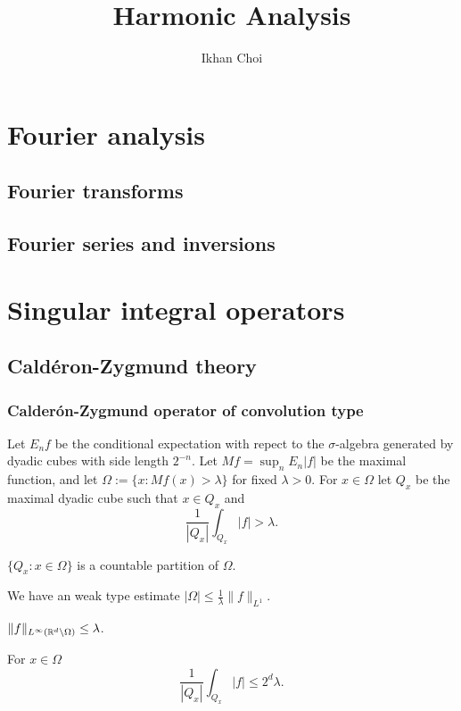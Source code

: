 \documentclass{../note}
\begin{document}
\title{Harmonic Analysis}
\author{Ikhan Choi}
\maketitle
\tableofcontents

\part{Fourier analysis}

\chapter{Fourier transforms}

\chapter{Fourier series and inversions}

\chapter{}

\part{Singular integral operators}
\chapter{Cald\'eron-Zygmund theory}

\section{Calder\'on-Zygmund operator of convolution type}
\begin{prb}
Let $E_nf$ be the conditional expectation with repect to the $\sigma$-algebra generated by dyadic cubes with side length $2^{-n}$.
Let $Mf=\sup_nE_n|f|$ be the maximal function, and let $\Omega:=\{x:Mf(x)>\lambda\}$ for fixed $\lambda>0$.
For $x\in\Omega$ let $Q_x$ be the maximal dyadic cube such that $x\in Q_x$ and
\[\frac1{|Q_x|}\int_{Q_x}|f|>\lambda.\]
\begin{parts}
\item
$\{Q_x:x\in\Omega\}$ is a countable partition of $\Omega$.
\item
We have an weak type estimate $|\Omega|\le\frac1\lambda\|f\|_{L^1}$.
\item
$\|f\|_{L^\infty(\mathbb{R}^d\setminus\Omega)}\le\lambda$.
\item
For $x\in\Omega$
\[\frac1{|Q_x|}\int_{Q_x}|f|\le2^d\lambda.\]
\end{parts}
\end{prb}
\end{document}

